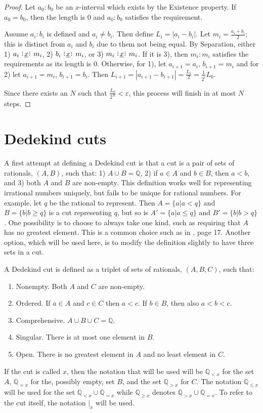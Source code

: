 \documentclass[12pt]{article}
\newcommand{\qcut}[2][x]{\ensuremath{\mathbb{Q}_{#2 #1}}}
\newcommand{\qlt}[1][x]{\qcut[#1]{<}}
\newcommand{\qeq}[1][x]{\qcut[#1]{=}}
\newcommand{\qgt}[1][x]{\qcut[#1]{>}}
\newcommand{\qgeq}[1][x]{\qcut[#1]{\geq}}
\newcommand{\qleq}[1][x]{\qcut[#1]{\leq}}
\newcommand{\cut}[1][x]{{\vert}_{#1} }
\begin{document}
\begin{proof}
    Let $a_0:b_0$ be an $x$-interval which exists by the Existence property. If $a_0 = b_0$, then the length is 0 and $a_0:b_0$ satisfies the requirement. 
    
    Assume $a_i:b_i$ is defined and $a_i \neq b_i$. Then define $L_i = |a_i - b_i|$. Let $m_i = \frac{a_i + b_i}{2}$; this is distinct from $a_i$ and $b_i$ due to them not being equal. By Separation, either 1) $a_i \xrel m_i$, 2) $b_i \xrel m_i$, or 3) $m_i \xrel m_i$. If it is 3), then $m_i:m_i$ satisfies the requirements as its length is 0. Otherwise, for 1), let $a_{i+1}= a_i$, $b_{i+1} = m_i$ and for 2) let $a_{i+1} = m_i$, $b_{i+1} = b_i$. Then $L_{i+1} = |a_{i+1} - b_{i+1}| = \frac{L_i}{2} = \frac{1}{2^{i}} L_0 $. 

    Since there exists an $N$ such that $\frac{L_0}{2^N} < \varepsilon$, this process will finish in at most $N$ steps. 
\end{proof}




\section{Dedekind cuts}

A first attempt at defining a Dedekind cut is that a cut is a pair of sets of rationals, $(A, B)$, such that: 1) $A \cup B = \mathbb{Q}$, 2) if $a \in A$ and $b \in B$, then $a < b$, and 3) both $A$ and $B$ are non-empty. This definition works well for representing irrational numbers uniquely, but fails to be unique for rational numbers. For example, let $q$ be the rational to represent. Then $A = \{a | a < q\}$ and $B= \{b | b \geq q\}$ is a cut representing $q$, but so is  $A' = \{a | a \leq q\}$ and $B'= \{b | b > q\}$. One possibility is to choose to always take one kind, such as requiring that $A$ has no greatest element. This is a common choice such as in \cite{rudin}, page 17. Another option, which will be used here, is to modify the definition slightly to have three sets in a cut.

A Dedekind cut is defined as a triplet of sets of rationals, $(A, B, C)$, such that: 
\begin{enumerate}
    \item Nonempty. Both $A$ and $C$ are non-empty.
    \item Ordered. If $a \in A$ and $c \in C$ then $a < c$. If $b \in B$, then also $a < b < c$. 
    \item Comprehensive. $A \cup B \cup C = \mathbb{Q}$.
    \item Singular. There is at most one element in $B$.
    \item Open. There is no greatest element in $A$ and no least element in $C$.
\end{enumerate}
If the cut is called $x$, then the notation that will be used will be $\qlt$ for the set $A$, $\qeq$ for the, possibly empty, set $B$, and the set $\qgt$ for $C$. The notation $\qleq$ will be used for the set $\qlt \cup \qeq$ while $\qgeq$ denotes $\qgt \cup \qeq$. To refer to the cut itself, the notation $\cut$ will be used. 
\end{document}
